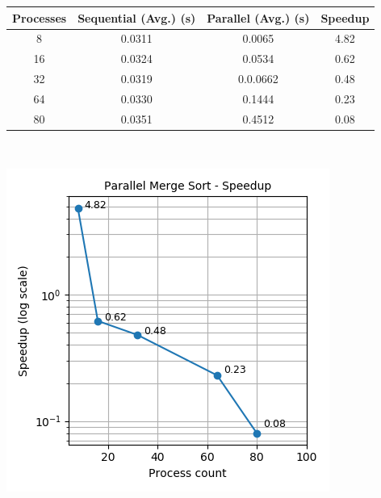 \documentclass[11pt,a4paper,oneside]{article}
\begin{document}
	  \begin{center}
		\begin{tabular}{|c|c|c|c|}
			\hline 
			\textbf{Processes}  & \textbf{Sequential (Avg.) (s)} & \textbf{Parallel (Avg.) (s)} & \textbf{Speedup} \\
			\hline
		    8 &  0.0311 & 0.0065 & 4.82\\ 
			\hline 
		    16 &  0.0324 & 0.0534 & 0.62\\
			\hline 
			32 &  0.0319 & 0.0.0662 & 0.48\\
			\hline 
			64 &  0.0330 & 0.1444 & 0.23\\ 
			\hline 
			80 &  0.0351 & 0.4512 & 0.08 \\
			\hline  
		\end{tabular}
	\end{center}
	\begin{verbatim}
	
	\end{verbatim}
	\begin{center}
		\includegraphics[scale=0.7]{4.png}		
	\end{center}

     \begin{verbatim}
             
     
     
     \end{verbatim}
\end{document}
